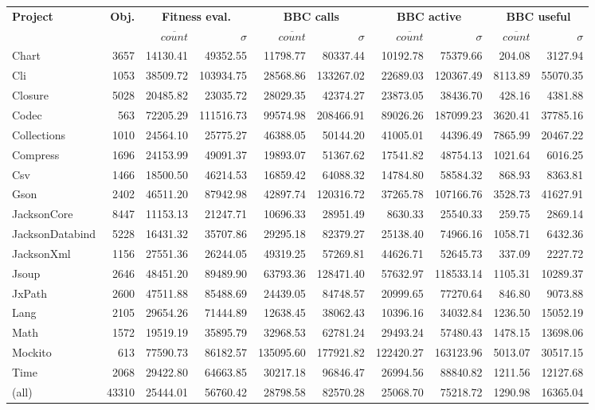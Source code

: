 \begin{tabular}{ l | r | r r | r r | r r | r r }
\textbf{Project} & \textbf{Obj.} & \multicolumn{2}{c|}{\textbf{Fitness eval.}} & \multicolumn{2}{c|}{\textbf{BBC calls}} & \multicolumn{2}{c|}{\textbf{BBC active}} & \multicolumn{2}{c}{\textbf{BBC useful}} \\ 
  &   & $\overline{count}$ & $\sigma$ & $\overline{count}$ & $\sigma$ & $\overline{count}$ & $\sigma$ & $\overline{count}$ & $\sigma$ \\ 
\hline 
Chart & 3657 & 14130.41 & 49352.55 & 11798.77 & 80337.44 & 10192.78 & 75379.66 & 204.08 & 3127.94 \\ 
Cli & 1053 & 38509.72 & 103934.75 & 28568.86 & 133267.02 & 22689.03 & 120367.49 & 8113.89 & 55070.35 \\ 
Closure & 5028 & 20485.82 & 23035.72 & 28029.35 & 42374.27 & 23873.05 & 38436.70 & 428.16 & 4381.88 \\ 
Codec & 563 & 72205.29 & 111516.73 & 99574.98 & 208466.91 & 89026.26 & 187099.23 & 3620.41 & 37785.16 \\ 
Collections & 1010 & 24564.10 & 25775.27 & 46388.05 & 50144.20 & 41005.01 & 44396.49 & 7865.99 & 20467.22 \\ 
Compress & 1696 & 24153.99 & 49091.37 & 19893.07 & 51367.62 & 17541.82 & 48754.13 & 1021.64 & 6016.25 \\ 
Csv & 1466 & 18500.50 & 46214.53 & 16859.42 & 64088.32 & 14784.80 & 58584.32 & 868.93 & 8363.81 \\ 
Gson & 2402 & 46511.20 & 87942.98 & 42897.74 & 120316.72 & 37265.78 & 107166.76 & 3528.73 & 41627.91 \\ 
JacksonCore & 8447 & 11153.13 & 21247.71 & 10696.33 & 28951.49 & 8630.33 & 25540.33 & 259.75 & 2869.14 \\ 
JacksonDatabind & 5228 & 16431.32 & 35707.86 & 29295.18 & 82379.27 & 25138.40 & 74966.16 & 1058.71 & 6432.36 \\ 
JacksonXml & 1156 & 27551.36 & 26244.05 & 49319.25 & 57269.81 & 44626.71 & 52645.73 & 337.09 & 2227.72 \\ 
Jsoup & 2646 & 48451.20 & 89489.90 & 63793.36 & 128471.40 & 57632.97 & 118533.14 & 1105.31 & 10289.37 \\ 
JxPath & 2600 & 47511.88 & 85488.69 & 24439.05 & 84748.57 & 20999.65 & 77270.64 & 846.80 & 9073.88 \\ 
Lang & 2105 & 29654.26 & 71444.89 & 12638.45 & 38062.43 & 10396.16 & 34032.84 & 1236.50 & 15052.19 \\ 
Math & 1572 & 19519.19 & 35895.79 & 32968.53 & 62781.24 & 29493.24 & 57480.43 & 1478.15 & 13698.06 \\ 
Mockito & 613 & 77590.73 & 86182.57 & 135095.60 & 177921.82 & 122420.27 & 163123.96 & 5013.07 & 30517.15 \\ 
Time & 2068 & 29422.80 & 64663.85 & 30217.18 & 96846.47 & 26994.56 & 88840.82 & 1211.56 & 12127.68 \\ 
(all) & 43310 & 25444.01 & 56760.42 & 28798.58 & 82570.28 & 25068.70 & 75218.72 & 1290.98 & 16365.04 \\ 
\end{tabular}
